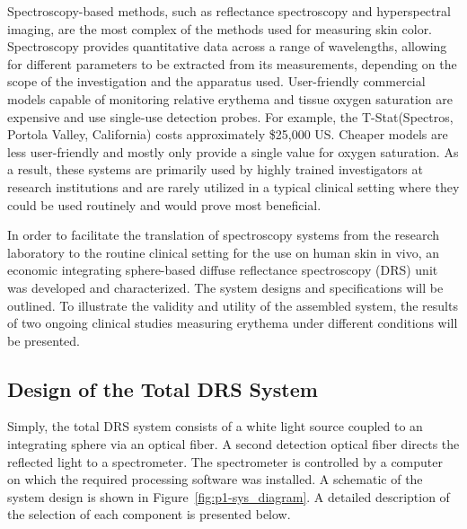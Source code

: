 Spectroscopy-based methods, such as reflectance spectroscopy and hyperspectral imaging, are the most complex of the methods used for measuring skin color.\cite{Zhang2005,Stamatas2008,Kollias2010,Yudovsky2010,Chin2012} Spectroscopy provides quantitative data across a range of wavelengths, allowing for different parameters to be extracted from its measurements, depending on the scope of the investigation and the apparatus used. User-friendly commercial models capable of monitoring relative erythema and tissue oxygen saturation are expensive and use single-use detection probes. For example, the T-Stat\textregistered (Spectros, Portola Valley, California) costs approximately \$25,000 US.\cite{Fox2012} Cheaper models are less user-friendly and mostly only provide a single value for oxygen saturation. As a result, these systems are primarily used by highly trained investigators at research institutions and are rarely utilized in a typical clinical setting where they could be used routinely and would prove most beneficial.

In order to facilitate the translation of spectroscopy systems from the research laboratory to the routine clinical setting for the use on human skin in vivo, an economic integrating sphere-based diffuse reflectance spectroscopy (DRS) unit was developed and characterized. The system designs and specifications will be outlined. To illustrate the validity and utility of the assembled system, the results of two ongoing clinical studies measuring erythema under different conditions will be presented.

\subsection{Design of the Total DRS System}
Simply, the total DRS system consists of a white light source coupled to an integrating sphere via an optical fiber. A second detection optical fiber directs the reflected light to a spectrometer. The spectrometer is controlled by a computer on which the required processing software was installed. A schematic of the system design is shown in Figure~\ref{fig:p1-sys_diagram}. A detailed description of the selection of each component is presented below.

